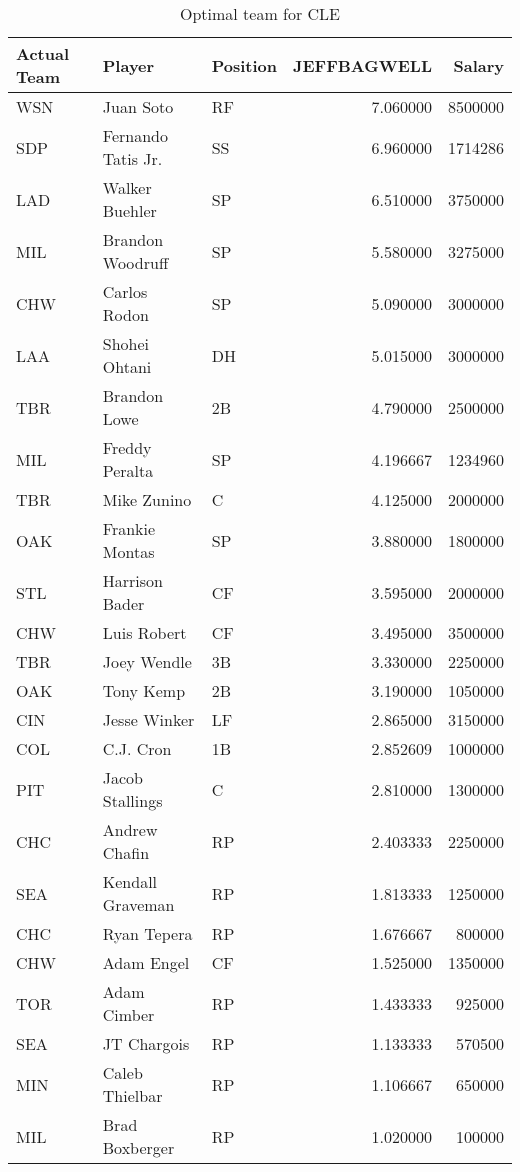 \begin{table}

\caption{Optimal team for CLE}
\centering
\begin{tabular}[t]{l|l|l|r|r}
\hline
Actual Team & Player & Position & JEFFBAGWELL & Salary\\
\hline
WSN & Juan Soto & RF & 7.060000 & 8500000\\
\hline
SDP & Fernando Tatis Jr. & SS & 6.960000 & 1714286\\
\hline
LAD & Walker Buehler & SP & 6.510000 & 3750000\\
\hline
MIL & Brandon Woodruff & SP & 5.580000 & 3275000\\
\hline
CHW & Carlos Rodon & SP & 5.090000 & 3000000\\
\hline
LAA & Shohei Ohtani & DH & 5.015000 & 3000000\\
\hline
TBR & Brandon Lowe & 2B & 4.790000 & 2500000\\
\hline
MIL & Freddy Peralta & SP & 4.196667 & 1234960\\
\hline
TBR & Mike Zunino & C & 4.125000 & 2000000\\
\hline
OAK & Frankie Montas & SP & 3.880000 & 1800000\\
\hline
STL & Harrison Bader & CF & 3.595000 & 2000000\\
\hline
CHW & Luis Robert & CF & 3.495000 & 3500000\\
\hline
TBR & Joey Wendle & 3B & 3.330000 & 2250000\\
\hline
OAK & Tony Kemp & 2B & 3.190000 & 1050000\\
\hline
CIN & Jesse Winker & LF & 2.865000 & 3150000\\
\hline
COL & C.J. Cron & 1B & 2.852609 & 1000000\\
\hline
PIT & Jacob Stallings & C & 2.810000 & 1300000\\
\hline
CHC & Andrew Chafin & RP & 2.403333 & 2250000\\
\hline
SEA & Kendall Graveman & RP & 1.813333 & 1250000\\
\hline
CHC & Ryan Tepera & RP & 1.676667 & 800000\\
\hline
CHW & Adam Engel & CF & 1.525000 & 1350000\\
\hline
TOR & Adam Cimber & RP & 1.433333 & 925000\\
\hline
SEA & JT Chargois & RP & 1.133333 & 570500\\
\hline
MIN & Caleb Thielbar & RP & 1.106667 & 650000\\
\hline
MIL & Brad Boxberger & RP & 1.020000 & 100000\\
\hline
\end{tabular}
\end{table}
